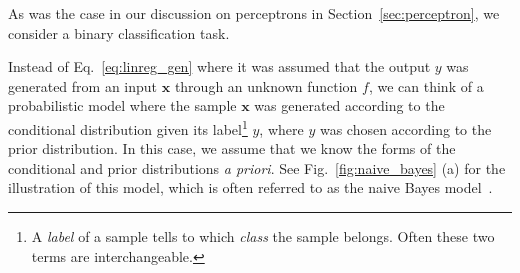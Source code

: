 \documentclass{now}
\newcommand{\vect}[1]{\mathbf{#1}}
\newcommand{\vx}[0]{\vect{x}}
\begin{document}
As was the case in our discussion on perceptrons in
Section~\ref{sec:perceptron}, we consider a binary classification task. 

Instead of Eq.~\eqref{eq:linreg_gen} where it was assumed that the output $y$
was generated from an input $\vx$ through an unknown function $f$, we can think
of a probabilistic model where the sample $\vx$ was generated according to the
conditional distribution given its
label\footnote{ 
    A \textit{label} of a sample tells to which \textit{class} the sample
    belongs. Often these two terms are interchangeable.
} $y$, where $y$ was chosen according to the prior distribution.  In this case,
we assume that we know the forms of the conditional and prior distributions
\textit{a priori}. See Fig.~\ref{fig:naive_bayes} (a) for the illustration of
this model, which is often referred to as the naive Bayes model~\citep[see,
e.g.,][Chapter 1.5.4]{Bishop2006}.
\end{document}
